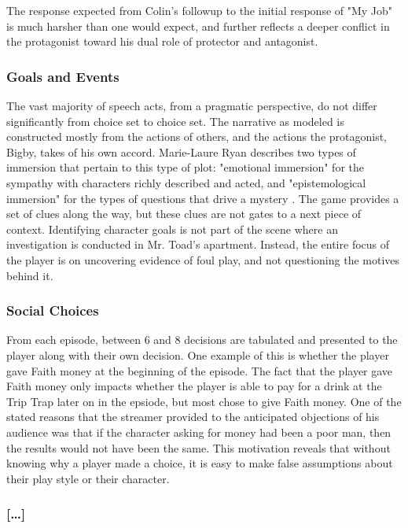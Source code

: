 The response expected from Colin's followup to the initial response of
"My Job" is much harsher than one would expect, and further reflects a
deeper conflict in the protagonist toward his dual role of protector
and antagonist.

\subsubsection{Goals and Events}
\label{sec:orgheadline9}
The vast majority of speech acts, from a pragmatic perspective, do not
differ significantly from choice set to choice set. The narrative as
modeled is constructed mostly from the actions of others, and the
actions the protagonist, Bigby, takes of his own accord. Marie-Laure
Ryan describes two types of immersion that pertain to this type of
plot: "emotional immersion" for the sympathy with characters richly
described and acted, and "epistemological immersion" for the types of
questions that drive a mystery \cite{Ryan2009a}. The game provides a
set of clues along the way, but these clues are not gates to a next
piece of context. Identifying character goals is not part of the scene
where an investigation is conducted in Mr. Toad's apartment. Instead,
the entire focus of the player is on uncovering evidence of foul play,
and not questioning the motives behind it.

\subsubsection{Social Choices}
\label{sec:orgheadline10}
From each episode, between 6 and 8 decisions are tabulated and
presented to the player along with their own decision. One example of
this is whether the player gave Faith money at the beginning of the
episode. The fact that the player gave Faith money only impacts
whether the player is able to pay for a drink at the Trip Trap later
on in the epsiode, but most chose to give Faith money. One of the
stated reasons that the streamer provided to the anticipated
objections of his audience was that if the character asking for money
had been a poor man, then the results would not have been the
same. This motivation reveals that without knowing why a player made a
choice, it is easy to make false assumptions about their play style or
their character.

\subsubsection{[\ldots{}]}
\label{sec:orgheadline11}

